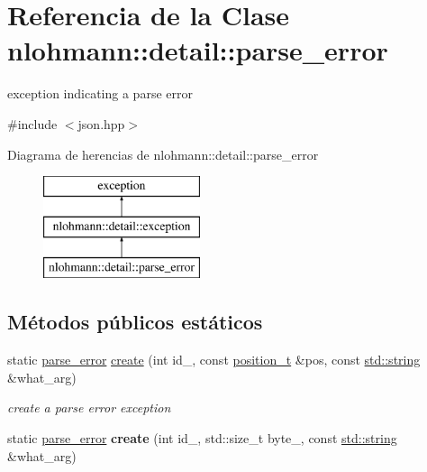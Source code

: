 \hypertarget{classnlohmann_1_1detail_1_1parse__error}{}\section{Referencia de la Clase nlohmann\+:\+:detail\+:\+:parse\+\_\+error}
\label{classnlohmann_1_1detail_1_1parse__error}


exception indicating a parse error  




{\ttfamily \#include $<$json.\+hpp$>$}

Diagrama de herencias de nlohmann\+:\+:detail\+:\+:parse\+\_\+error\begin{figure}[H]
\begin{center}
\leavevmode
\includegraphics[height=3.000000cm]{classnlohmann_1_1detail_1_1parse__error}
\end{center}
\end{figure}
\subsection*{Métodos públicos estáticos}
\begin{DoxyCompactItemize}
\item 
static \mbox{\hyperlink{classnlohmann_1_1detail_1_1parse__error}{parse\+\_\+error}} \mbox{\hyperlink{classnlohmann_1_1detail_1_1parse__error_a137ea4d27de45d8a844fd13451d40f3d}{create}} (int id\+\_\+, const \mbox{\hyperlink{structnlohmann_1_1detail_1_1position__t}{position\+\_\+t}} \&pos, const \mbox{\hyperlink{namespacenlohmann_1_1detail_a1ed8fc6239da25abcaf681d30ace4985ab45cffe084dd3d20d928bee85e7b0f21}{std\+::string}} \&what\+\_\+arg)
\begin{DoxyCompactList}\small\item\em create a parse error exception \end{DoxyCompactList}\item 
\mbox{\label{classnlohmann_1_1detail_1_1parse__error_a9fd60ad6bce80fd99686ad332faefd37}} 
static \mbox{\hyperlink{classnlohmann_1_1detail_1_1parse__error}{parse\+\_\+error}} {\bfseries create} (int id\+\_\+, std\+::size\+\_\+t byte\+\_\+, const \mbox{\hyperlink{namespacenlohmann_1_1detail_a1ed8fc6239da25abcaf681d30ace4985ab45cffe084dd3d20d928bee85e7b0f21}{std\+::string}} \&what\+\_\+arg)
\end{DoxyCompactItemize}
